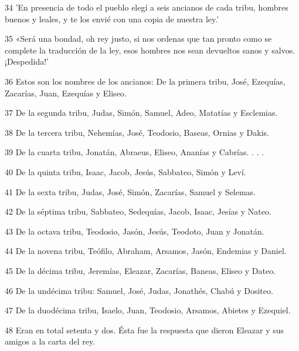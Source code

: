 \par 34 'En presencia de todo el pueblo elegí a seis ancianos de cada tribu, hombres buenos y leales, y te los envié con una copia de nuestra ley.'

\par 35 «Será una bondad, oh rey justo, si nos ordenas que tan pronto como se complete la traducción de la ley, esos hombres nos sean devueltos sanos y salvos. ¡Despedida!'

\par 36 Estos son los nombres de los ancianos: De la primera tribu, José, Ezequías, Zacarías, Juan, Ezequías y Eliseo.

\par 37 De la segunda tribu, Judas, Simón, Samuel, Adeo, Matatías y Esclemias.

\par 38 De la tercera tribu, Nehemías, José, Teodosio, Baseas, Ornias y Dakis.

\par 39 De la cuarta tribu, Jonatán, Abraeus, Eliseo, Ananías y Cabrías. . . .

\par 40 De la quinta tribu, Isaac, Jacob, Jesús, Sabbateo, Simón y Leví.

\par 41 De la sexta tribu, Judas, José, Simón, Zacarías, Samuel y Selemas.

\par 42 De la séptima tribu, Sabbateo, Sedequías, Jacob, Isaac, Jesías y Nateo.

\par 43 De la octava tribu, Teodosio, Jasón, Jesús, Teodoto, Juan y Jonatán.

\par 44 De la novena tribu, Teófilo, Abraham, Arsamos, Jasón, Endemias y Daniel.

\par 45 De la décima tribu, Jeremías, Eleazar, Zacarías, Baneas, Eliseo y Dateo.

\par 46 De la undécima tribu: Samuel, José, Judas, Jonathés, Chabú y Dositeo.

\par 47 De la duodécima tribu, Isaelo, Juan, Teodosio, Arsamos, Abietes y Ezequiel.

\par 48 Eran en total setenta y dos. Ésta fue la respuesta que dieron Eleazar y sus amigos a la carta del rey.

